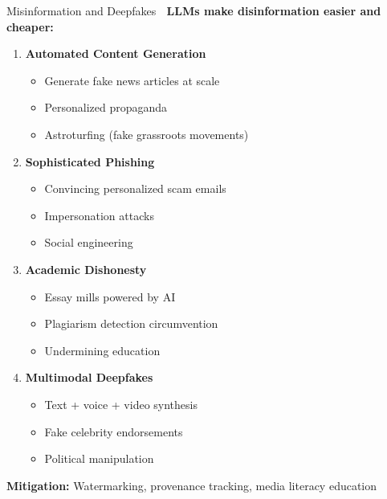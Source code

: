 \documentclass[aspectratio=169]{beamer}
\begin{document}
\begin{frame}[shrink=10]{Misinformation and Deepfakes 📰}
\textbf{LLMs make disinformation easier and cheaper:}

\vspace{0.5em}

\begin{enumerate}\setlength{\itemsep}{0pt}
    \item \textbf{Automated Content Generation}
    \begin{itemize}\setlength{\itemsep}{0pt}
        \item Generate fake news articles at scale
        \item Personalized propaganda
        \item Astroturfing (fake grassroots movements)
    \end{itemize}

    \item \textbf{Sophisticated Phishing}
    \begin{itemize}\setlength{\itemsep}{0pt}
        \item Convincing personalized scam emails
        \item Impersonation attacks
        \item Social engineering
    \end{itemize}

    \item \textbf{Academic Dishonesty}
    \begin{itemize}\setlength{\itemsep}{0pt}
        \item Essay mills powered by AI
        \item Plagiarism detection circumvention
        \item Undermining education
    \end{itemize}

    \item \textbf{Multimodal Deepfakes}
    \begin{itemize}\setlength{\itemsep}{0pt}
        \item Text + voice + video synthesis
        \item Fake celebrity endorsements
        \item Political manipulation
    \end{itemize}
\end{enumerate}

\vspace{0.3em}

\textbf{Mitigation:} Watermarking, provenance tracking, media literacy education
\end{frame}
\end{document}
